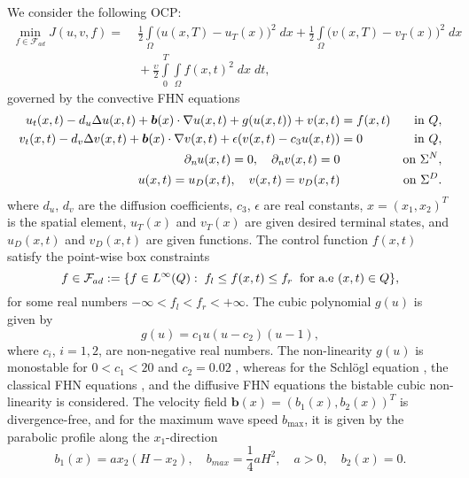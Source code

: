 \documentclass[preprint,12pt]{elsarticle}
\begin{document}
We consider the following OCP:
\begin{equation} \label{ocp}
\begin{aligned}
\min \limits_{f \in \mathcal{F}_{ad}} J(u,v,f)
     = & \; \frac{1}{2}  \int \limits_{\Omega} \big( u(x,T)-u_T(x) \big)^2 \; dx
       + \frac{1}{2}  \int \limits_{\Omega} \big( v(x,T)-v_T(x) \big)^2 \; dx  \\
     & \; +  \frac{\upsilon}{2}   \int \limits_{0}^{T} \int \limits_{\Omega}  f(x,t)^2 \; dx\;dt,
\end{aligned}
\end{equation}
governed by the convective FHN equations
\begin{equation}\label{state}
\begin{aligned}
u_t(x,t) - d_u \Delta u(x,t) + \bm{b}(x) \cdot \nabla u(x,t) + g(u(x,t)) + v(x,t)   &= f(x,t) & \text{ in } Q,  \\
v_t(x,t) - d_v \Delta v(x,t) + \bm{b}(x) \cdot \nabla v(x,t) + \epsilon (v(x,t) - c_3 u(x,t)) &= 0 & \text{ in } Q,\\
\partial_{\emph{n}} u(x,t) = 0, \quad  \partial_{\emph{n}} v(x,t) =  0  && \text{on   } \Sigma^{N},\\
u(x,t) =  u_D(x,t), \quad  v(x,t) = v_D(x,t) && \text{on  } \Sigma^{D}.
\end{aligned}
\end{equation}
where $d_u$, $d_v$ are the diffusion coefficients, $c_3$, $\epsilon$ are real constants, $x=(x_1,x_2)^T$ is the spatial element, $u_T(x)$ and $v_T(x)$ are given desired terminal states, and $u_D(x,t)$ and $v_D(x,t)$ are given functions.
The control function $f(x,t)$  satisfy the point-wise box constraints
\begin{equation*}
f \in \mathcal{F}_{ad} := \{ f \in L^{\infty}(Q): \; f_l \leq f(x,t) \leq f_r \;\; \hbox{for   a.e   } (x,t) \in Q \},
\end{equation*}
for some real numbers $-\infty < f_l < f_r < +\infty $.
The cubic polynomial $g(u)$ is given by
\begin{equation*}
g(u)=c_{1} u(u-c_{2})(u-1),
\end{equation*}
where $c_{i}$,  $i=1,2$, are non-negative real numbers. The non-linearity $g(u)$ is monostable for $0 < c_1< 20$ and $c_2=0.02$  \cite{Ermakova09opo}, whereas for the Schl\"ogl equation \cite{buchholz13ocs},  the classical FHN equations \cite{Casas13}, and the diffusive FHN equations \cite{Karasozen15} the bistable cubic non-linearity is  considered.  The velocity field $\bm{b}(x)= (b_1(x), b_2(x))^T$ is divergence-free, and for the maximum wave speed $b_{\max}$, it is given by the parabolic profile along the $x_1$-direction
\begin{equation*}
b_1(x) = ax_2(H-x_2), \quad b_{max}=\frac{1}{4}aH^2, \quad a >0 , \quad b_2(x) = 0.
\end{equation*}
\end{document}
